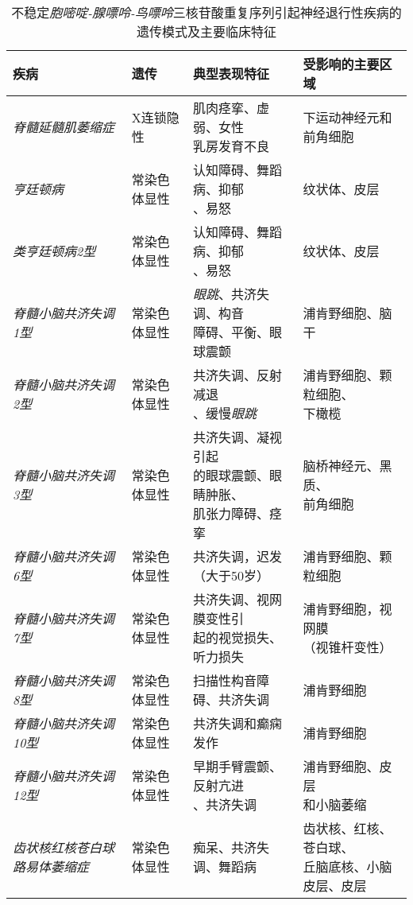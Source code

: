 \begin{table}[htbp]
	\caption{不稳定\textit{胞嘧啶-腺嘌呤-鸟嘌呤}三核苷酸重复序列引起神经退行性疾病的遗传模式及主要临床特征} \label{tab:63_1} \centering
	\begin{tabular}{llll}
		\toprule
		疾病 & 遗传 & 典型表现特征 & 受影响的主要区域\\
		\midrule
		\textit{脊髓延髓肌萎缩症} & X连锁隐性 & \makecell{肌肉痉挛、虚弱、女性\\乳房发育不良} & 下运动神经元和前角细胞 \\
		\textit{亨廷顿病} & 常染色体显性 & \makecell{认知障碍、舞蹈病、抑郁\\、易怒} & 纹状体、皮层 \\
		\textit{类亨廷顿病2型} & 常染色体显性 & \makecell{认知障碍、舞蹈病、抑郁\\、易怒} & 纹状体、皮层 \\
		\textit{脊髓小脑共济失调1型} & 常染色体显性 & \makecell{\textit{眼跳}、共济失调、构音\\障碍、平衡、眼球震颤} & 浦肯野细胞、脑干 \\
		\textit{脊髓小脑共济失调2型} & 常染色体显性 & \makecell{共济失调、反射减退\\、缓慢\textit{眼跳}} & \makecell{浦肯野细胞、颗粒细胞、\\下橄榄} \\
		\textit{脊髓小脑共济失调3型} & 常染色体显性 & \makecell{共济失调、凝视引起\\的眼球震颤、眼睛肿胀、\\肌张力障碍、痉挛} & \makecell{脑桥神经元、黑质、\\前角细胞} \\
		\textit{脊髓小脑共济失调6型} & 常染色体显性 & \makecell{共济失调，迟发\\（大于50岁）} & 浦肯野细胞、颗粒细胞 \\
		\textit{脊髓小脑共济失调7型} & 常染色体显性 & \makecell{共济失调、视网膜变性引\\起的视觉损失、听力损失} & \makecell{浦肯野细胞，视网膜\\（视锥杆变性）} \\
		\textit{脊髓小脑共济失调8型} & 常染色体显性 & 扫描性构音障碍、共济失调 & 浦肯野细胞 \\
		\textit{脊髓小脑共济失调10型} & 常染色体显性 & 共济失调和癫痫发作 & 浦肯野细胞 \\
		\textit{脊髓小脑共济失调12型} & 常染色体显性 & \makecell{早期手臂震颤、反射亢进\\、共济失调} & \makecell{浦肯野细胞、皮层\\和小脑萎缩} \\
		\textit{齿状核红核苍白球路易体萎缩症} & 常染色体显性 & 痴呆、共济失调、舞蹈病 & \makecell{齿状核、红核、苍白球、\\丘脑底核、小脑皮层、皮层} \\
		\bottomrule
	\end{tabular}
\end{table}


